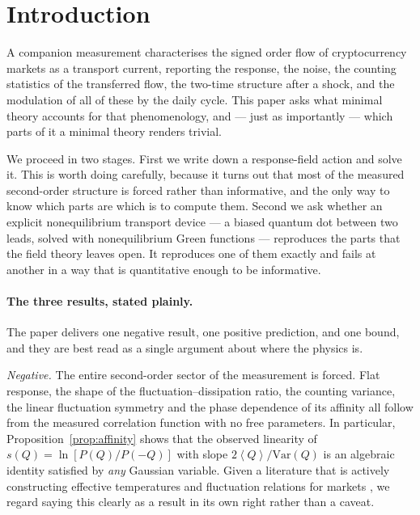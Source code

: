\documentclass[aps,pre,twocolumn,superscriptaddress,floatfix,nofootinbib]{revtex4-2}
\newcommand{\avg}[1]{\left\langle #1 \right\rangle}
\newcommand{\Var}{\mathrm{Var}}
\begin{document}
\maketitle

\section{Introduction}

A companion measurement \cite{paper1} characterises the signed order flow of
cryptocurrency markets as a transport current, reporting the response, the
noise, the counting statistics of the transferred flow, the two-time structure
after a shock, and the modulation of all of these by the daily cycle. This paper
asks what minimal theory accounts for that phenomenology, and --- just as
importantly --- which parts of it a minimal theory renders trivial.

We proceed in two stages. First we write down a response-field action and solve
it. This is worth doing carefully, because it turns out that most of the
measured second-order structure is forced rather than informative, and the only
way to know which parts are which is to compute them. Second we ask whether an
explicit nonequilibrium transport device --- a biased quantum dot between two
leads, solved with nonequilibrium Green functions --- reproduces the parts that
the field theory leaves open. It reproduces one of them exactly and fails at
another in a way that is quantitative enough to be informative.

\paragraph*{The three results, stated plainly.}
The paper delivers one negative result, one positive prediction, and one bound,
and they are best read as a single argument about where the physics is.

\emph{Negative.} The entire second-order sector of the measurement is forced.
Flat response, the shape of the fluctuation--dissipation ratio, the counting
variance, the linear fluctuation symmetry and the phase dependence of its
affinity all follow from the measured correlation function with no free
parameters. In particular, Proposition~\ref{prop:affinity} shows that the
observed linearity of $s(Q)=\ln[P(Q)/P(-Q)]$ with slope $2\avg{Q}/\Var(Q)$ is an
algebraic identity satisfied by \emph{any} Gaussian variable. Given a literature
that is actively constructing effective temperatures and fluctuation relations
for markets \cite{yura2014,ramezani2025,gao2026,li2024entropy}, we regard
saying this clearly as a result in its own right rather than a caveat.
\end{document}
